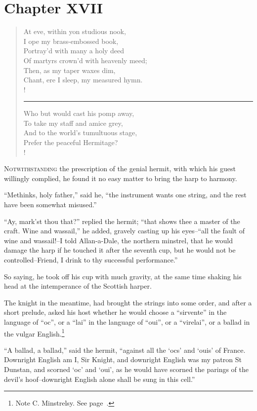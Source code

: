 \chapter{Chapter XVII}

\begin{verse}
At eve, within yon studious nook,\\
I ope my brass-embossed book,\\
Portray'd with many a holy deed\\
Of martyrs crown'd with heavenly meed;\\
Then, as my taper waxes dim,\\
Chant, ere I sleep, my measured hymn.\\!
\rule{.7\textwidth}{.2pt}

Who but would cast his pomp away,\\
To take my staff and amice grey,\\
And to the world's tumultuous stage,\\
Prefer the peaceful Hermitage?\\!
\end{verse}

\lettrine{N}{otwithstanding} the prescription of the genial hermit,
with which his
guest willingly complied, he found it no easy matter to bring the harp
to harmony.

``Methinks, holy father,'' said he, ``the instrument wants one string,
and the rest have been somewhat misused.''

``Ay, mark'st thou that?'' replied the hermit; ``that shows thee a
master of the craft. Wine and wassail,'' he added, gravely casting up
his eyes--``all the fault of wine and wassail!--I told Allan-a-Dale, the
northern minstrel, that he would damage the harp if he touched it after
the seventh cup, but he would not be controlled--Friend, I drink to thy
successful performance.''

So saying, he took off his cup with much gravity, at the same time
shaking his head at the intemperance of the Scottish harper.

The knight in the meantime, had brought the strings into some order, and
after a short prelude, asked his host whether he would choose a
``sirvente'' in the language of ``oc'', or a ``lai'' in the language of
``oui'', or a ``virelai'', or a ballad in the vulgar
English.\footnote{Note C. Minstrelsy. See page~\pageref{noteCXVII}.}

``A ballad, a ballad,'' said the hermit, ``against all the `ocs' and
`ouis' of France. Downright English am I, Sir Knight, and downright
English was my patron St Dunstan, and scorned `oc' and `oui', as he
would have scorned the parings of the devil's hoof--downright English
alone shall be sung in this cell.''

